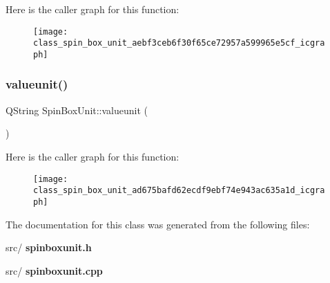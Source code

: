 Here is the caller graph for this function\+:\nopagebreak
\begin{figure}[H]
\begin{center}
\leavevmode
\texttt{[image: class\_spin\_box\_unit\_aebf3ceb6f30f65ce72957a599965e5cf\_icgraph]}
\end{center}
\end{figure}
\mbox{\label{class_spin_box_unit_ad675bafd62ecdf9ebf74e943ac635a1d}} 
\subsubsection{valueunit()}
{\footnotesize\ttfamily Q\+String Spin\+Box\+Unit\+::valueunit (\begin{DoxyParamCaption}{ }\end{DoxyParamCaption})}

Here is the caller graph for this function\+:\nopagebreak
\begin{figure}[H]
\begin{center}
\leavevmode
\texttt{[image: class\_spin\_box\_unit\_ad675bafd62ecdf9ebf74e943ac635a1d\_icgraph]}
\end{center}
\end{figure}


The documentation for this class was generated from the following files\+:\begin{DoxyCompactItemize}
\item 
src/\textbf{ spinboxunit.\+h}\item 
src/\textbf{ spinboxunit.\+cpp}\end{DoxyCompactItemize}
